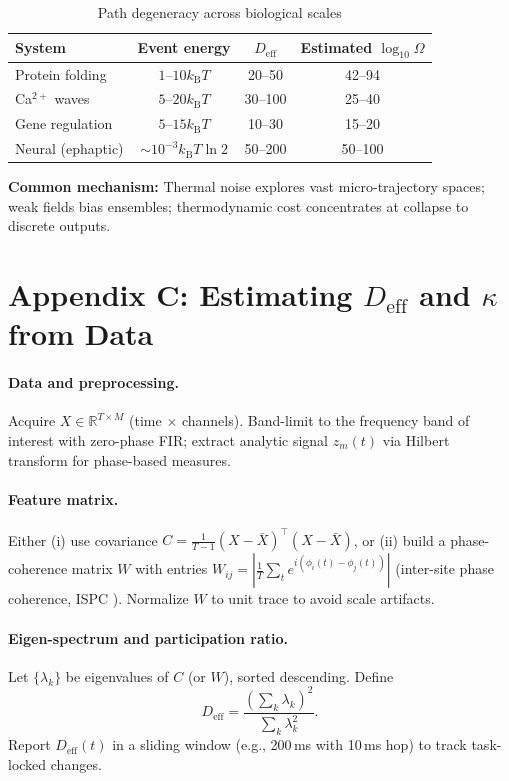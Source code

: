 \documentclass[12pt]{article}
\numberwithin{equation}{section}
\newcommand{\kB}{k_{\mathrm{B}}}
\begin{document}
\begin{table}[h]
\centering
\caption{Path degeneracy across biological scales}
\label{tab:cross-scale}
\begin{tabular}{@{}lccc@{}}
\toprule
System & Event energy & $D_{\text{eff}}$ & Estimated $\log_{10}\Omega$ \\
\midrule
Protein folding & $1$--$10 \kB T$ & 20--50 & 42--94 \\
Ca$^{2+}$ waves & $5$--$20 \kB T$ & 30--100 & 25--40 \\
Gene regulation & $5$--$15 \kB T$ & 10--30 & 15--20 \\
Neural (ephaptic) & $\sim 10^{-3} \kB T\ln 2$ & 50--200 & 50--100 \\
\bottomrule
\end{tabular}
\end{table}

\textbf{Common mechanism:} Thermal noise explores vast micro-trajectory spaces; weak fields bias ensembles; thermodynamic cost concentrates at collapse to discrete outputs.

\section{Appendix C: Estimating $D_{\mathrm{eff}}$ and $\kappa$ from Data}

\paragraph{Data and preprocessing.}
Acquire $X\in\mathbb{R}^{T\times M}$ (time $\times$ channels). Band-limit to the frequency band of interest with zero-phase FIR; extract analytic signal $z_m(t)$ via Hilbert transform for phase-based measures.

\paragraph{Feature matrix.}
Either (i) use covariance $C=\frac{1}{T-1}(X-\bar X)^\top(X-\bar X)$, or (ii) build a phase-coherence matrix $W$ with entries $W_{ij}=\left|\frac{1}{T}\sum_t e^{i(\phi_i(t)-\phi_j(t))}\right|$ (inter-site phase coherence, ISPC \cite{stringer2019}). Normalize $W$ to unit trace to avoid scale artifacts.

\paragraph{Eigen-spectrum and participation ratio.}
Let $\{\lambda_k\}$ be eigenvalues of $C$ (or $W$), sorted descending. Define
\[
D_{\mathrm{eff}} = \frac{\left(\sum_k \lambda_k\right)^2}{\sum_k \lambda_k^2}.
\]
Report $D_{\mathrm{eff}}(t)$ in a sliding window (e.g., 200\,ms with 10\,ms hop) to track task-locked changes.
\end{document}
